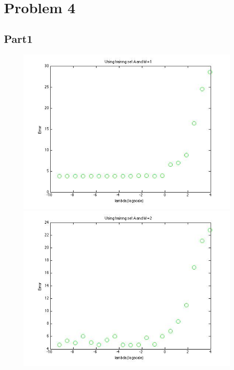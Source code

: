 \section{Problem 4}

\subsection{Part1}


\begin{figure}[!htb]
  \includegraphics[width=\linewidth]{figures/p4_LAD_regressA_m=1}
\endminipage\hfill
{}
  \includegraphics[width=\linewidth]{figures/p4_LAD_regressA_m=2}
\endminipage\hfill

\end{figure}

